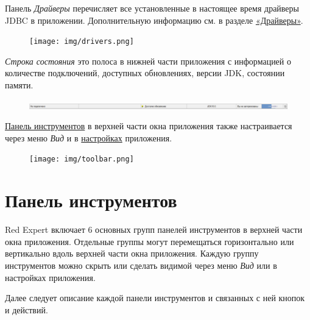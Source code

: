 
Панель \textit{Драйверы} перечисляет все установленные в настоящее время драйверы JDBC в приложении. Дополнительную информацию см. в разделе \hyperref[sec:drivers]{«Драйверы»}.

\begin{figure}[H]
	\centering
	\texttt{[image: img/drivers.png]}
\end{figure}


\textit{Строка состояния} это полоса в нижней части приложения с информацией о количестве подключений, доступных обновлениях, версии JDK, состоянии памяти.

\begin{figure}[H]
	\centering
	\includegraphics[width = 1\linewidth]{img/status_bar.png}
\end{figure}

\hyperref[sec:toolbar]{Панель инструментов} в верхней части окна приложения также настраивается через меню \textit{Вид} и в \hyperref[sec:pref_toolbar]{настройках} приложения.

\begin{figure}[H]
	\centering
	\texttt{[image: img/toolbar.png]}
\end{figure}

\newpage
\section{Панель инструментов}\label{sec:toolbar}

Red Expert включает 6 основных групп панелей инструментов в верхней части окна приложения. Отдельные группы могут перемещаться горизонтально или вертикально вдоль верхней части окна приложения. Каждую группу инструментов можно скрыть или сделать видимой через меню \textit{Вид} или в настройках приложения.

Далее следует описание каждой панели инструментов и связанных с ней кнопок и действий. 

